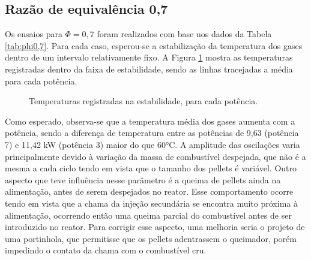 \subsection{Razão de equivalência 0,7}
Os ensaios para $\Phi = 0,7$ foram realizados com base nos dados da Tabela \ref{tab:phi0,7}. Para cada caso, esperou-se a estabilização da temperatura dos gases dentro de um intervalo relativamente fixo. A  Figura \ref{fig:est_temp} mostra as temperaturas registradas dentro da faixa de estabilidade, sendo as linhas tracejadas a média para cada potência.

\begin{figure}[!ht]
	\centering
	\caption{Temperaturas registradas na estabilidade, para cada potência.}
	\label{fig:est_temp}
\end{figure}

Como esperado, observa-se que a temperatura média dos gases aumenta com a potência, sendo a diferença de temperatura entre as potências de 9,63 (potência 7) e 11,42 kW (potência 3) maior do que 60°C. A amplitude das oscilações varia principalmente devido à variação da massa de combustível despejada, que não é a mesma a cada ciclo tendo em vista que o tamanho dos pellets é variável. Outro aspecto que teve influência nesse parâmetro é a queima de pellets ainda na alimentação, antes de serem despejados no reator. Esse comportamento ocorre tendo em vista que a chama da injeção secundária se encontra muito próxima à alimentação, ocorrendo então uma queima parcial do combustível antes de ser introduzido no reator. Para corrigir esse aspecto, uma melhoria seria o projeto de uma portinhola, que permitisse que os pellets adentrassem o queimador, porém impedindo o contato da chama com o combustível cru.

